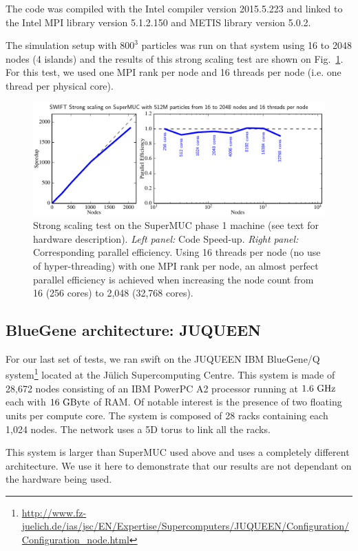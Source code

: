\documentclass{sig-alternate-05-2015}
\newcommand{\swift}{{\sc swift}\xspace}
\begin{document}
The code was compiled with the Intel compiler version \textsc{2015.5.223} and
linked to the Intel MPI library version \textsc{5.1.2.150} and METIS library
version \textsc{5.0.2}.

The simulation setup with $800^3$ particles was run on that system using 16 to
2048 nodes (4 islands) and the results of this strong scaling test are shown on
Fig.~\ref{fig:superMUC}. For this test, we used one MPI rank per node and 16
threads per node (i.e. one thread per physical core).

\begin{figure}
\centering
\includegraphics[width=\textwidth]{Figures/scalingSuperMUC}
\caption{Strong scaling test on the SuperMUC phase 1 machine (see text
  for hardware description). \textit{Left panel:} Code
  Speed-up. \textit{Right panel:} Corresponding parallel efficiency.
  Using 16 threads per node (no use of hyper-threading) with one MPI rank
  per node, an almost perfect parallel efficiency is achieved when
  increasing the node count from 16 (256 cores) to 2,048 (32,768
  cores).
  \label{fig:superMUC}}
\end{figure}


\subsection{BlueGene architecture: JUQUEEN}

For our last set of tests, we ran \swift on the JUQUEEN IBM BlueGene/Q
system\footnote{\url{http://www.fz-juelich.de/ias/jsc/EN/Expertise/Supercomputers/JUQUEEN/Configuration/Configuration_node.html}}
located at the J\"ulich Supercomputing Centre. This system is made of
28,672 nodes consisting of an IBM PowerPC A2 processor running at
$1.6~\rm{GHz}$ each with $16~\rm{GByte}$ of RAM. Of notable interest
is the presence of two floating units per compute core. The system is
composed of 28 racks containing each 1,024 nodes. The network uses a
5D torus to link all the racks.

This system is larger than SuperMUC used above and uses a completely different
architecture. We use it here to demonstrate that our results are not dependant
on the hardware being used.
\end{document}
